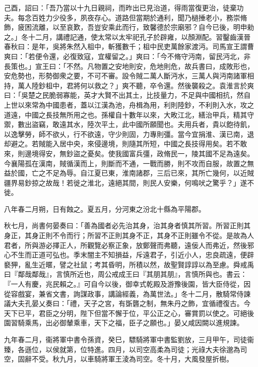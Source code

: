 \begin{pinyinscope}
己酉，詔曰：「吾乃當以十九日親祠，而昨出已見治道，得雨當復更治，徒棄功夫。每念百姓力少役多，夙夜存心。道路但當期於通利，聞乃檛捶老小，務崇脩飾，疲困流離，以至哀歎，吾豈安乘此而行，致馨德於宗廟邪？自今已後，明申勑之。」冬十二月，講禮記通，使太常以太牢祀孔子於辟雍，以顏淵配。習鑿齒漢晉春秋曰：是年，吳將朱然入柤中，斬獲數千；柤中民吏萬餘家渡沔。司馬宣王謂曹爽曰：「若便令還，必復致寇，宜權留之。」爽曰：「今不脩守沔南，留民沔北，非長策也。」宣王曰：「不然。凡物置之安地則安，危地則危，故兵書曰，成敗形也，安危勢也，形勢御衆之要，不可不審。設令賊二萬人斷沔水，三萬人與沔南諸軍相持，萬人陸鈔柤中，君將何以救之？」爽不聽，卒令還。然後襲殺之。袁淮言於爽曰：「吳楚之民脆弱寡能，英才大賢不出其土，比技量力，不足與中國相抗，然自上世以來常為中國患者，蓋以江漢為池，舟楫為用，利則陸鈔，不利則入水，攻之道遠，中國之長技無所用之也。孫權自十數年以來，大畋江北，繕治甲兵，精其守禦，數出盜竊，敢遠其水，陸次平土，此中國所願聞也。夫用兵者，貴以飽待飢，以逸擊勞，師不欲乆，行不欲遠，守少則固，力專則彊。當今宜捐淮、漢已南，退却避之。若賊能入居中央，來侵邊境，則隨其所短，中國之長技得用矣。若不敢來，則邊境得安，無鈔盜之憂矣。使我國富兵彊，政脩民一，陵其國不足為遠矣。今襄陽孤在漢南，賊循漢而上，則斷而不通，一戰而勝，則不攻而自服，故置之無益於國，亡之不足為辱。自江夏已東，淮南諸郡，三后已來，其所亡幾何，以近賊疆界易鈔掠之故哉！若徙之淮北，遠絕其間，則民人安樂，何鳴吠之驚乎？」遂不徙。

八年春二月朔，日有蝕之。夏五月，分河東之汾北十縣為平陽郡。

秋七月，尚書何晏奏曰：「善為國者必先治其身，治其身者慎其所習。所習正則其身正，其身正則不令而行；所習不正則其身不正，其身不正則雖令不從。是故為人君者，所與游必擇正人，所觀覽必察正象，放鄭聲而弗聽，遠佞人而弗近，然後邪心不生而正道可弘也。季末闇主不知損益，斥遠君子，引近小人，忠良疏遠，便辟褻狎，亂生近暱，譬之社鼠；考其昏明，所積以然，故聖賢諄諄以為至慮。舜戒禹曰『鄰哉鄰哉』，言慎所近也，周公戒成王曰『其朋其朋』，言慎所與也。書云：『一人有慶，兆民賴之。』可自今以後，御幸式乾殿及游豫後園，皆大臣侍從，因從容戲宴，兼省文書，詢謀政事，講論經義，為萬世法。」冬十二月，散騎常侍諫議大夫孔晏乂奏曰：「禮，天子之宮，有斲礱之制，無朱丹之飾，宜循禮復古。今天下已平，君臣之分明，陛下但當不懈于位，平公正之心，審賞罰以使之。可絕後園習騎乘馬，出必御輦乘車，天下之福，臣子之願也。」晏乂咸因闕以進規諫。

九年春二月，衞將軍中書令孫資，癸巳，驃騎將軍中書監劉放，三月甲午，司徒衞臻，各遜位，以侯就第，位特進。四月，以司空高柔為司徒；光祿大夫徐邈為司空，固辭不受。秋九月，以車騎將軍王淩為司空。冬十月，大風發屋折樹。


\end{pinyinscope}
